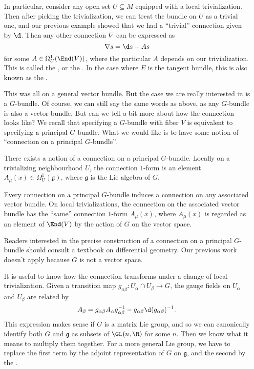 \documentclass[a4paper]{article}
\begin{document}
In particular, consider any open set $U \subseteq M$ equipped with a local trivialization. Then after picking the trivialization, we can treat the bundle on $U$ as a trivial one, and our previous example showed that we had a ``trivial'' connection given by $\d$. Then any other connection $\nabla$ can be expressed as
\[
  \nabla s = \d s + A s
\]
for some $A \in \Omega^1_U(\End(V))$, where the particular $A$ depends on our trivialization. This is called the , or the . In the case where $E$ is the tangent bundle, this is also known as the .

This was all on a general vector bundle. But the case we are really interested in is a $G$-bundle. Of course, we can still say the same words as above, as any $G$-bundle is also a vector bundle. But can we tell a bit more about how the connection looks like? We recall that specifying a $G$-bundle with fiber $V$ is equivalent to specifying a principal $G$-bundle. What we would like is to have some notion of ``connection on a principal $G$-bundle''.

\begin{thm}
  There exists a notion of a connection on a principal $G$-bundle. Locally on a trivializing neighbourhood $U$, the connection $1$-form is an element $A_\mu(x) \in \Omega^1_U(\mathfrak{g})$, where $\mathfrak{g}$ is the Lie algebra of $G$.

  Every connection on a principal $G$-bundle induces a connection on any associated vector bundle. On local trivializations, the connection on the associated vector bundle has the ``same'' connection $1$-form $A_\mu(x)$, where $A_\mu(x)$ is regarded as an element of $\End(V)$ by the action of $G$ on the vector space.
\end{thm}

Readers interested in the precise construction of a connection on a principal $G$-bundle should consult a textbook on differential geometry. Our previous work doesn't apply because $G$ is not a vector space.

It is useful to know how the connection transforms under a change of local trivialization. Given a transition map $g_{\alpha\beta}: U_\alpha \cap U_\beta \to G$, the gauge fields on $U_\alpha$ and $U_\beta$ are related by
\[
  A_\beta = g_{\alpha \beta} A_\alpha g_{\alpha\beta}^{-1} - g_{\alpha\beta} \d (g_{\alpha\beta})^{-1}.
\]
This expression makes sense if $G$ is a matrix Lie group, and so we can canonically identify both $G$ and $\mathfrak{g}$ as subsets of $\GL(n, \R)$ for some $n$. Then we know what it means to multiply them together. For a more general Lie group, we have to replace the first term by the adjoint representation of $G$ on $\mathfrak{g}$, and the second by the .
\end{document}
